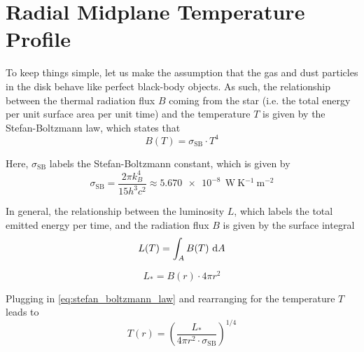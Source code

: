 \clearpage\section{Radial Midplane Temperature Profile}

    To keep things simple, let us make the assumption that the gas and dust particles 
    in the disk behave like perfect black-body objects. As such, the relationship between the
    thermal radiation flux $B$ coming from the star (i.e. the total energy per unit surface area 
    per unit time) and the temperature $T$ is given by the Stefan-Boltzmann law, which states that
    \begin{equation}
        \label{eq:stefan_boltzmann_law}
        B(T) = \sigma_\text{SB}\cdot T^4   %
    \end{equation}

    Here, $\sigma_\text{SB}$ labels the Stefan-Boltzmann constant, which is given by 
    \begin{equation}
        \sigma_\text{SB}
            = \frac{2\pi k_B^4}{15h^3 c^2}
            \approx \SI{5.670e-8}{\ \watt\ \kelvin^{-1}\ \meter^{-2}}
    \end{equation}

    In general, the relationship between the luminosity $L$, which labels the total emitted energy 
    per time, and the radiation flux $B$ is given by the surface integral
    \begin{equation}
        L(T) = \int_A B(T) \ \text dA
    \end{equation}
    
    \begin{equation}
        L_* = B(r) \cdot 4\pi r^2
    \end{equation}

    Plugging in \cref{eq:stefan_boltzmann_law} and rearranging for the temperature $T$ leads to
    \begin{equation}
        T(r) = \left(
            \frac{L_*}{4\pi r^2 \cdot \sigma_\text{SB}}
        \right)^{1/4}
    \end{equation}

